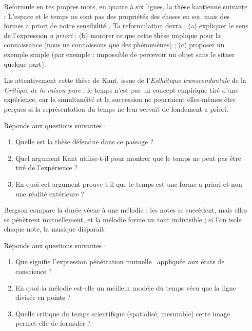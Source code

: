 \documentclass[11pt]{article}
\newcommand{\cle}[1]{{\popxbold\color{popdark}#1}}
\newcounter{popsec}
\newcounter{popsub}
\newcommand{\courssub}[1]{%
  \stepcounter{popsub}%
  \par\vspace{9pt}\noindent{\popxbold\fontsize{11.5}{13}\selectfont\color{popink}{\color{poporange}\thepopsec.\thepopsub}\hspace{6pt}#1}\par\nopagebreak\vspace{4pt}
}
\begin{document}
\courssub{Je m'entraîne}

\begin{exercice}
Reformule en tes propres mots, en quatre à six lignes, la thèse kantienne suivante : \guillemotleft L'espace et le temps ne sont pas des propriétés des choses en soi, mais des formes a priori de notre sensibilité \guillemotright. Ta reformulation devra : (a) expliquer le sens de l'expression \emph{a priori} ; (b) montrer ce que cette thèse implique pour la connaissance (nous ne connaissons que des phénomènes) ; (c) proposer un exemple simple (par exemple : impossible de percevoir un objet sans le situer quelque part).
\end{exercice}

\begin{exercice}
Lis attentivement cette thèse de Kant, issue de l'\emph{Esthétique transcendantale} de la \emph{Critique de la raison pure} : le temps n'est pas un concept empirique tiré d'une expérience, car la simultanéité et la succession ne pourraient elles-mêmes être perçues si la représentation du temps ne leur servait de fondement a priori.

Réponds aux questions suivantes :
\begin{enumerate}
\item Quelle est la thèse défendue dans ce passage ?
\item Quel argument Kant utilise-t-il pour montrer que le temps ne peut pas être tiré de l'expérience ?
\item En quoi cet argument prouve-t-il que le temps est une \cle{forme a priori} et non une réalité extérieure ?
\end{enumerate}
\end{exercice}

\begin{exercice}
Bergson compare la durée vécue à une mélodie : les notes se succèdent, mais elles se pénètrent mutuellement, et la mélodie forme un tout indivisible ; si l'on isole chaque note, la musique disparaît.

Réponds aux questions suivantes :
\begin{enumerate}
\item Que signifie l'expression \guillemotleft pénétration mutuelle \guillemotright\ appliquée aux états de conscience ?
\item En quoi la mélodie est-elle un meilleur modèle du temps vécu que la ligne divisée en points ?
\item Quelle critique du temps scientifique (spatialisé, mesurable) cette image permet-elle de formuler ?
\end{enumerate}
\end{exercice}
\end{document}
